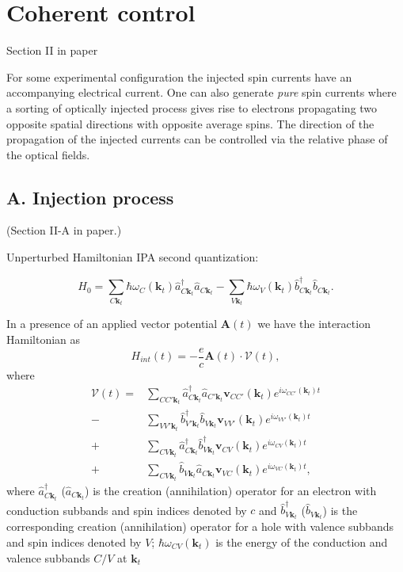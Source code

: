 \documentclass{article}
\newcommand{\kt}{\mathbf{k}_{t}}
\begin{document}
\newpage
\section{Coherent control} %
\label{sec:coherent_control}
{\small Section II in paper}

For some experimental configuration the injected spin currents have an
accompanying electrical current. One can also generate \emph{pure} spin currents
where a sorting of optically injected process gives rise to electrons
propagating two opposite spatial directions with opposite average spins. The
direction of the propagation of the injected currents can be controlled via the
relative phase of the optical fields.

\subsection{A. Injection process}
{\small (Section II-A in paper.) \\}

Unperturbed Hamiltonian IPA second quantization:

\begin{equation*}\label{eq:unperturbed_hamiltonian}
H_{0} = \sum_{C\kt} \hbar \omega_{C}(\kt) \hat{a}^{\dag}_{C\kt} \hat{a}^{}_{C\kt}  - 
        \sum_{V\kt} \hbar \omega_{V}(\kt) \hat{b}^{\dag}_{C\kt} \hat{b}^{}_{C\kt}.
\end{equation*}

In a presence of an applied vector potential $\mathbf{A}(t)$ we have the
interaction Hamiltonian as
\begin{equation*}\label{interaction_hamiltonian}
H_{int}(t) = - \frac{e}{c} \mathbf{A}(t) \cdot \mathcal{V}(t),
\end{equation*}
where
\begin{align*}
\mathcal{V}(t)  
=& \sum_{CC'\kt} \hat{a}^{\dag}_{C \kt} \hat{a}       _{C'\kt} 
\mathbf{v}_{CC'}(\kt) e^{i\omega_{CC'}(\kt)t} \\
-& \sum_{VV'\kt} \hat{b}^{\dag}_{V'\kt} \hat{b}       _{V \kt} 
\mathbf{v}_{VV'}(\kt) e^{i\omega_{VV'}(\kt)t} \\
+& \sum_{CV \kt} \hat{a}^{\dag}_{C \kt} \hat{b}^{\dag}_{V \kt} 
\mathbf{v}_{CV }(\kt) e^{i\omega_{CV }(\kt)t} \\
+& \sum_{CV \kt} \hat{b}       _{V \kt} \hat{a}       _{C \kt} 
\mathbf{v}_{VC }(\kt) e^{i\omega_{VC }(\kt)t},
\end{align*}
where $\hat{a}^{\dag}_{C\kt} $ ($\hat{a}_{C\kt}$) is the creation (annihilation)
operator for an electron with conduction subbands and spin indices denoted by
$c$ and $\hat{b}^{\dag}_{V\kt} $ ($\hat{b}_{V\kt}$) is the corresponding
creation (annihilation) operator for a hole with valence subbands and spin
indices denoted by $V$; $\hbar\omega_{CV}(\kt)$ is the energy of the conduction
and valence subbands $C/V$ at $\kt$
\end{document}
